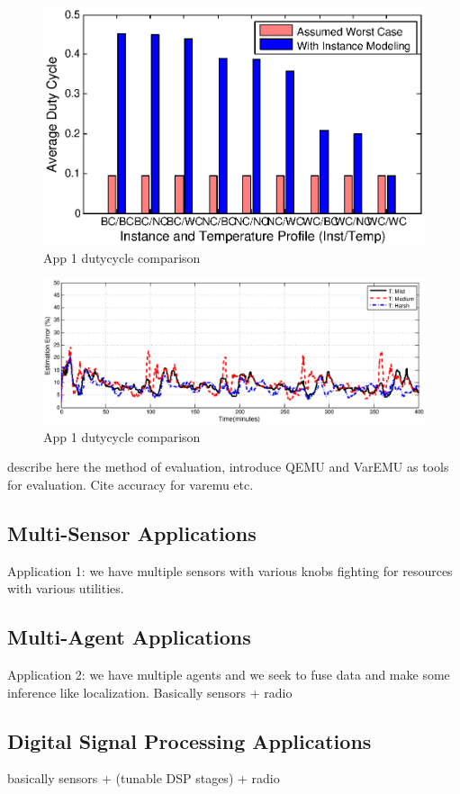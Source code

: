 \begin{figure}
\centering
\includegraphics[width=1\columnwidth]{figures/app1_dutycycles.eps}
\caption{\label{fig:app1}App 1 dutycycle comparison}
\end{figure}

\begin{figure}
\centering
\includegraphics[width=1\columnwidth]{figures/localization_var.eps}
\caption{\label{fig:app1}App 1 dutycycle comparison}
\end{figure}



describe here the method of evaluation, introduce QEMU and VarEMU as tools for evaluation. Cite accuracy for varemu etc. 

\subsection{Multi-Sensor Applications}
Application 1: we have multiple sensors with various knobs fighting for resources with various utilities.

\subsection{Multi-Agent Applications}
Application 2: we have multiple agents and we seek to fuse data and make some inference like localization. Basically sensors + radio

\subsection{Digital Signal Processing Applications}
basically sensors + (tunable DSP stages) + radio